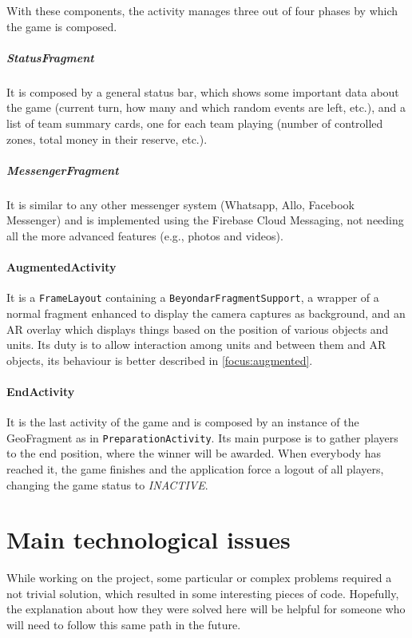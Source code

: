 			With these components, the activity manages three out of four phases by which the game is composed.
			
			\subparagraph{StatusFragment}
			
			It is composed by a general status bar, which shows some important data about the game (current turn, how many and which random events are left, etc.), and a list of team summary cards, one for each team playing (number of controlled zones, total money in their reserve, etc.).
			
			\subparagraph{MessengerFragment}
			
			It is similar to any other messenger system (Whatsapp, Allo, Facebook Messenger) and is implemented using the Firebase Cloud Messaging, not needing all the more advanced features (e.g., photos and videos).
		
		\paragraph{AugmentedActivity}
		
		It is a \lstinline|FrameLayout| containing a \lstinline|BeyondarFragmentSupport|, a wrapper of a normal fragment enhanced to display the camera captures as background, and an AR overlay which displays things based on the position of various objects and units.
		Its duty is to allow interaction among units and between them and AR objects, its behaviour is better described in \autoref{focus:augmented}.
		
		\paragraph{EndActivity}
	
		It is the last activity of the game and is composed by an instance of the GeoFragment as in \lstinline|PreparationActivity|.
		Its main purpose is to gather players to the end position, where the winner will be awarded. When everybody has reached it, the game finishes and the application force a logout of all players, changing the game status to \emph{INACTIVE}.
	
	\section{Main technological issues}\label{focus:general}
		
		While working on the project, some particular or complex problems required a not trivial solution, which resulted in some interesting pieces of code.
		Hopefully, the explanation about how they were solved here will be helpful for someone who will need to follow this same path in the future.
		
